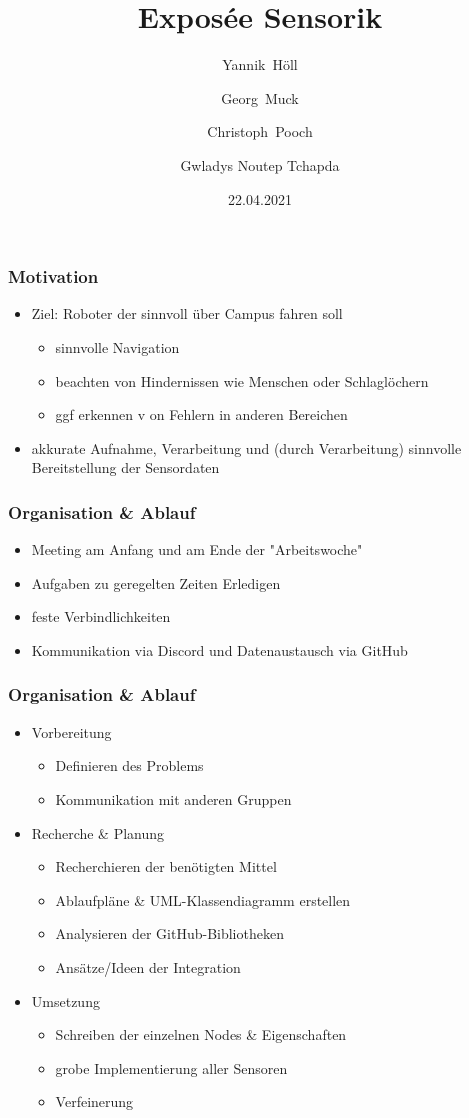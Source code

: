 \documentclass{beamer}
\title{Exposée Sensorik}
\author[Y. Höll, G. Muck, C. Pooch, G. N. Tchapda]
	{Yannik~Höll \\ \and Georg~Muck \\ \and Christoph~Pooch \\ \and  Gwladys Noutep Tchapda}
\date{22.04.2021}
\begin{document}
	\frame{\titlepage}


\begin{frame}
\frametitle{Motivation}
\begin{itemize}
\item<1-> Ziel: Roboter der sinnvoll über Campus fahren soll
\begin{itemize}
\item<2-4> sinnvolle Navigation
\item<3-4> beachten von Hindernissen wie Menschen oder Schlaglöchern
\item<4> ggf erkennen v on Fehlern in anderen Bereichen
\end{itemize}

\item<5-> akkurate \alert<6->{Aufnahme}, \alert<6->{Verarbeitung} und (durch \alert<6->{Verarbeitung}) sinnvolle \alert<6->{Bereitstellung} der Sensordaten
\end{itemize}
\end{frame}

 \begin{frame}
\frametitle{ Organisation \& Ablauf}
\begin{itemize}
\item<1-> \alert{Meeting} am Anfang und am Ende der "Arbeitswoche"
\item<2-> Aufgaben zu geregelten Zeiten Erledigen
\item<3-> feste \alert{Verbindlichkeiten}
\item<4-> Kommunikation via \alert{Discord} und Datenaustausch via \alert{GitHub}
\end{itemize}
\end{frame}

 \begin{frame}
\frametitle{Organisation \& Ablauf}
\begin{itemize}
\item<1-> Vorbereitung
\begin{itemize}
\item<2-3> Definieren des Problems
\item<3> Kommunikation mit anderen Gruppen
\end{itemize}
\item<4-> Recherche \& Planung
\begin{itemize}
\item<5-8> Recherchieren der benötigten Mittel
\item<6-8> Ablaufpläne \& UML-Klassendiagramm erstellen
\item<7-8> Analysieren der GitHub-Bibliotheken
\item<8> Ansätze/Ideen der Integration
\end{itemize}
 \item<9-> Umsetzung
\begin{itemize}
\item<10-12> Schreiben der einzelnen Nodes \& Eigenschaften
\item<11-12> grobe Implementierung aller Sensoren
\item<12> Verfeinerung
\end{itemize}
\end{itemize}
\end{frame}
\end{document}
